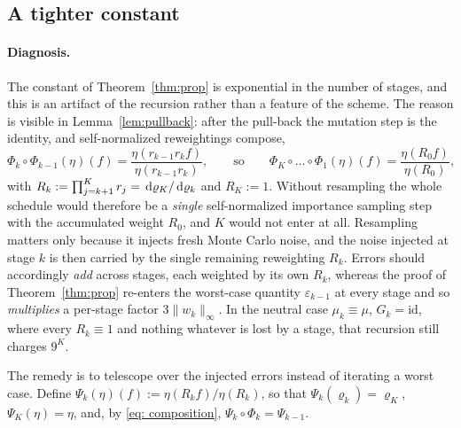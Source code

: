 \documentclass{article}
\begin{document}
{\color{red}
\subsection*{A tighter constant}

\paragraph{Diagnosis.} The constant of Theorem~\ref{thm:prop} is exponential in the number of stages, and this is an artifact of the recursion rather than a feature of the scheme. The reason is visible in Lemma~\ref{lem:pullback}: after the pull-back the mutation step is the identity, and self-normalized reweightings compose,
\begin{equation}
    \Phi_k\circ\Phi_{k-1}(\eta)(f)
    =\frac{\eta(r_{k-1}r_kf)}{\eta(r_{k-1}r_k)},
    \qquad\text{so}\qquad
    \Phi_K\circ\dots\circ\Phi_1(\eta)(f)=\frac{\eta(R_0f)}{\eta(R_0)},
    \label{eq: composition}
\end{equation}
with $R_k:=\prod_{j=k+1}^{K}r_j=\,\mathrm d\varrho_K/\,\mathrm d\varrho_k$ and $R_K:=1$. Without resampling the whole schedule would therefore be a \emph{single} self-normalized importance sampling step with the accumulated weight $R_0$, and $K$ would not enter at all. Resampling matters only because it injects fresh Monte Carlo noise, and the noise injected at stage $k$ is then carried by the single remaining reweighting $R_k$. Errors should accordingly \emph{add} across stages, each weighted by its own $R_k$, whereas the proof of Theorem~\ref{thm:prop} re-enters the worst-case quantity $\varepsilon_{k-1}$ at every stage and so \emph{multiplies} a per-stage factor $3\lVert w_k\rVert_\infty$. In the neutral case $\mu_k\equiv\mu$, $G_k=\mathrm{id}$, where every $R_k\equiv1$ and nothing whatever is lost by a stage, that recursion still charges $9^{K}$.

The remedy is to telescope over the injected errors instead of iterating a worst case. Define $\Psi_k(\eta)(f):=\eta(R_kf)/\eta(R_k)$, so that $\Psi_k(\varrho_k)=\varrho_K$, $\Psi_K(\eta)=\eta$, and, by \eqref{eq: composition}, $\Psi_k\circ\Phi_k=\Psi_{k-1}$.

}
\end{document}
